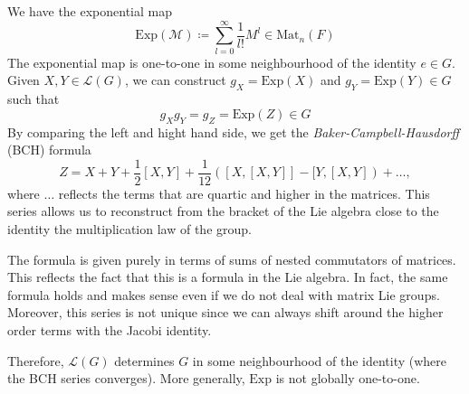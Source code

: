 We have the exponential map
\begin{equation}
  \text{Exp}(\mathcal{M}) \coloneqq \sum_{l=0}^\infty \frac{1}{l!}M^l \in \text{Mat}_n(F)
\end{equation}
The exponential map is one-to-one in some neighbourhood of the identity $e\in G$.
Given $X, Y \in \mathscr{L}(G)$, we can construct $g_X = \text{Exp}(X)$ and $g_Y = \text{Exp}(Y) \in G$ such that
\begin{equation}
  g_X g_Y = g_Z = \text{Exp}(Z) \in G
\end{equation}
By comparing the left and hight hand side, we get the \emph{Baker-Campbell-Hausdorff} (BCH) formula
\begin{equation}
  \label{eq:BCH-formula}
  Z = X + Y + \frac{1}{2}[X, Y] + \frac{1}{12}([X, [X, Y]] - [Y, [X, Y]) + \dots,
\end{equation}
where $\dots$ reflects the terms that are quartic and higher in the matrices.
This series allows us to reconstruct from the bracket of the Lie algebra close to the identity the multiplication law of the group.
\begin{leftbar}
  \begin{remark}
    The formula is given purely in terms of sums of nested commutators of matrices. This reflects the fact that this is a formula in the Lie algebra. In fact, the same formula holds and makes sense even if we do not deal with matrix Lie groups.
    Moreover, this series is not unique since we can always shift around the higher order terms with the Jacobi identity.
  \end{remark}
\end{leftbar}
Therefore, $\mathscr{L}(G)$ determines $G$ in some neighbourhood of the identity (where the BCH series converges). More generally, $\text{Exp}$ is not globally one-to-one.

